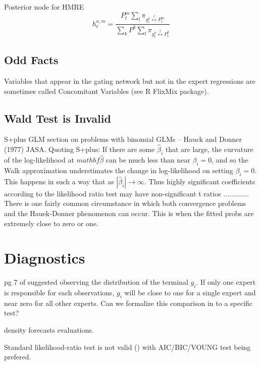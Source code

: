 \documentclass[12pt]{article}
\newcommand{\sumgateprod}[3]{\pi_{#1 \overset{#3}{\longleftrightarrow} #2}}
\newcommand{\shortsum}[1]{\sum \nolimits_{#1}}
\begin{document}
Posterior node for HMRE
\begin{equation} 
  h^{a,m}_{t} = \frac{P^{m}_{t} \shortsum{l} \sumgateprod{g^{a}_{t}}{P^{m}_{t}}{l}}{\sum_{k} P^{k} \shortsum{l} \sumgateprod{g^{a}_{t}}{P^{k}_{t}}{l}}
\end{equation}



\subsection{Odd Facts}

Variables that appear in the gating network but not in the expert regressions
are sometimes called Concomitant Variables (see R FlixMix package).




\subsection{Wald Test is Invalid}
S+plus GLM section on problems with binomial GLMs
  -- Hauck and Donner (1977) JASA. Quoting S+plus: If there are
  some $\hat{\beta}_{i}$ that are large, the curvature of the log-likelihood at
  $mathbf{\hat{\beta}}$ can be much less than near $\beta_{i}=0$, and so the Walk
  approximation understimates the change in log-likelihood on setting $\beta_{i}=0$.
  This happens in such a way that as $|\hat{\beta}_{i}| \rightarrow \infty$. Thus
  highly significant coefficients according to the likelihood ratio test may have
  non-significant t ratios ............. There is one fairly common circumstance
  in which both convergence problems and the Hauek-Donner phenomenon can occur.
  This is when the fitted probs are extremely close to zero or one.



\section{Diagnostics}
pg 7 of \cite{WMS1995} suggested observing the distribution of the terminal
$g_{i}$. If only one expert is responsible for each observations, $g_{i}$ will
be close to one for a single expert and near zero for all other experts.
Can we formalize this comparison in to a specific test?

density forecasts evaluations.

Standard likelihood-ratio test is not valid (\cite{CarvalhoTanner2006}) with
AIC/BIC/VOUNG test being prefered.




\printbibliography
\end{document}
